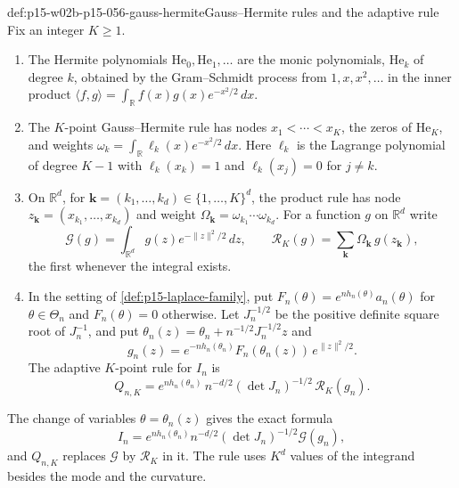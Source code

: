 \begin{hbdefinition}{def:p15-w02b-p15-056-gauss-hermite}{Gauss--Hermite rules and the adaptive rule}
Fix an integer \(K\geq1\).
\begin{enumerate}
\item The Hermite polynomials \(\mathrm{He}_0,\mathrm{He}_1,\ldots\) are
the monic polynomials, \(\mathrm{He}_k\) of degree \(k\), obtained by the
Gram--Schmidt process from \(1,x,x^2,\ldots\) in the inner product
\(\langle f,g\rangle=\int_{\mathbb R}f(x)g(x)e^{-x^2/2}\,dx\).
\item The \(K\)-point Gauss--Hermite rule has nodes \(x_1<\cdots<x_K\),
the zeros of \(\mathrm{He}_K\), and weights
\(\omega_k=\int_{\mathbb R}\ell_k(x)e^{-x^2/2}\,dx\). Here \(\ell_k\) is
the Lagrange polynomial of degree \(K-1\) with \(\ell_k(x_k)=1\) and
\(\ell_k(x_j)=0\) for \(j\neq k\).
\item On \(\mathbb R^d\), for
\(\mathbf k=(k_1,\ldots,k_d)\in\{1,\ldots,K\}^d\), the product rule has
node \(z_{\mathbf k}=(x_{k_1},\ldots,x_{k_d})\) and weight
\(\Omega_{\mathbf k}=\omega_{k_1}\cdots\omega_{k_d}\). For a function
\(g\) on \(\mathbb R^d\) write
\[
 \mathcal G(g)=\int_{\mathbb R^d}g(z)e^{-\|z\|^2/2}\,dz,\qquad
 \mathcal R_K(g)=\sum_{\mathbf k}\Omega_{\mathbf k}\,g(z_{\mathbf k}),
\]
the first whenever the integral exists.
\item In the setting of \cref{def:p15-laplace-family}, put
\(F_n(\theta)=e^{nh_n(\theta)}a_n(\theta)\) for \(\theta\in\Theta_n\)
and \(F_n(\theta)=0\) otherwise. Let \(J_n^{-1/2}\) be the positive
definite square root of \(J_n^{-1}\), and put
\(\theta_n(z)=\theta_n+n^{-1/2}J_n^{-1/2}z\) and
\[
 g_n(z)=e^{-nh_n(\theta_n)}F_n(\theta_n(z))\,e^{\|z\|^2/2}.
\]
The adaptive \(K\)-point rule for \(I_n\) is
\[
 Q_{n,K}=e^{nh_n(\theta_n)}\,n^{-d/2}(\det J_n)^{-1/2}\,
          \mathcal R_K(g_n).
\]
\end{enumerate}
The change of variables \(\theta=\theta_n(z)\) gives the exact formula
\[
 I_n=e^{nh_n(\theta_n)}n^{-d/2}(\det J_n)^{-1/2}\mathcal G(g_n),
\]
and \(Q_{n,K}\) replaces \(\mathcal G\) by \(\mathcal R_K\) in it. The rule
uses \(K^d\) values of the integrand besides the mode and the curvature.
\end{hbdefinition}

